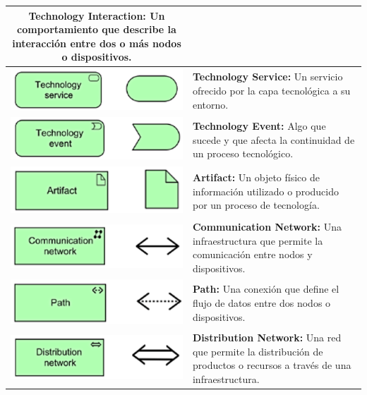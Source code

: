 \begin{longtable}{|c|p{8cm}|}
\textbf{Technology Interaction:} Un comportamiento que describe la interacción entre dos o más nodos o dispositivos. \\
\hline
\includegraphics{apendices/ARCHI/technology/service.png} & 
\textbf{Technology Service:} Un servicio ofrecido por la capa tecnológica a su entorno. \\
\hline
\includegraphics{apendices/ARCHI/technology/event.png} & 
\textbf{Technology Event:} Algo que sucede y que afecta la continuidad de un proceso tecnológico. \\
\hline
\includegraphics{apendices/ARCHI/technology/artifact.png} & 
\textbf{Artifact:} Un objeto físico de información utilizado o producido por un proceso de tecnología. \\
\hline
\includegraphics{apendices/ARCHI/technology/network.png} & 
\textbf{Communication Network:} Una infraestructura que permite la comunicación entre nodos y dispositivos. \\
\hline
\includegraphics{apendices/ARCHI/technology/path.png} & 
\textbf{Path:} Una conexión que define el flujo de datos entre dos nodos o dispositivos. \\
\hline
\includegraphics{apendices/ARCHI/technology/distribution.png} & 
\textbf{Distribution Network:} Una red que permite la distribución de productos o recursos a través de una infraestructura. \\
\hline
\end{longtable}

